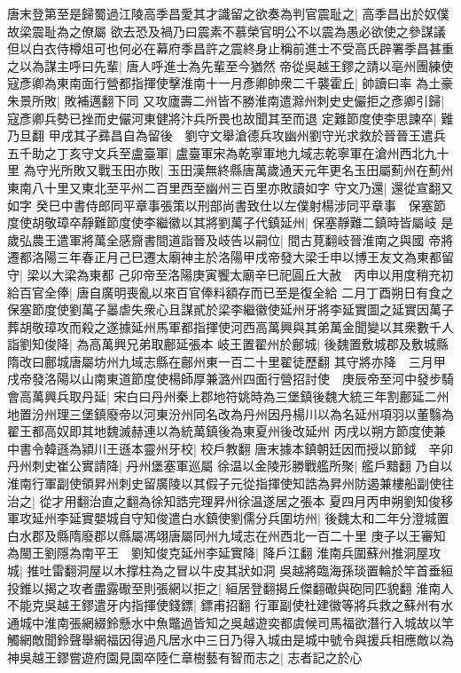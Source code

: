 唐末登第至是歸蜀過江陵高季昌愛其才識留之欲奏為判官震耻之|{
	高季昌出於奴僕故梁震耻為之僚屬}
欲去恐及禍乃曰震素不慕榮官明公不以震為愚必欲使之參謀議但以白衣侍樽俎可也何必在幕府季昌許之震終身止稱前進士不受高氏辟署季昌甚重之以為謀主呼曰先輩|{
	唐人呼進士為先輩至今猶然}
帝從吳越王鏐之請以亳州團練使寇彥卿為東南面行營都指揮使擊淮南十一月彥卿帥衆二千襲霍丘|{
	帥讀曰率}
為土豪朱景所敗|{
	敗補邁翻下同}
又攻廬壽二州皆不勝淮南遣滁州刺史史儼拒之彥卿引歸|{
	寇彥卿兵勢已挫而史儼河東健將汴兵所畏也故聞其至而退}
定難節度使李思諫卒|{
	難乃旦翻}
甲戌其子彞昌自為留後　劉守文舉滄德兵攻幽州劉守光求救於晉晉王遣兵五千助之丁亥守文兵至盧臺軍|{
	盧臺軍宋為乾寧軍地九域志乾寧軍在滄州西北九十里}
為守光所敗又戰玉田亦敗|{
	玉田漢無終縣唐萬歲通天元年更名玉田屬薊州在薊州東南八十里又東北至平州二百里西至幽州三百里亦敗讀如字}
守文乃還|{
	還從宣翻又如字}
癸巳中書侍郎同平章事張策以刑部尚書致仕以左僕射楊涉同平章事　保塞節度使胡敬璋卒靜難節度使李繼徽以其將劉萬子代鎮延州|{
	保塞靜難二鎮時皆屬岐}
是歲弘農王遣軍將萬全感齎書間道詣晉及岐告以嗣位|{
	間古莧翻岐晉淮南之與國}
帝將遷都洛陽三年春正月己巳遷太廟神主於洛陽甲戌帝發大梁壬申以博王友文為東都留守|{
	梁以大梁為東都}
己卯帝至洛陽庚寅饗太廟辛巳祀圓丘大赦　丙申以用度稍充初給百官全俸|{
	唐自廣明喪亂以來百官俸料額存而已至是復全給}
二月丁酉朔日有食之　保塞節度使劉萬子㬥虐失衆心且謀貳於梁李繼徽使延州牙將李延實圖之延實因萬子葬胡敬璋攻而殺之遂據延州馬軍都指揮使河西高萬興與其弟萬金聞變以其衆數千人詣劉知俊降|{
	為高萬興兄弟取鄜延張本}
岐王置翟州於鄜城|{
	後魏置敷城郡及敷城縣隋改曰鄜城唐屬坊州九域志縣在鄜州東一百二十里翟徒歷翻}
其守將亦降　三月甲戌帝發洛陽以山南東道節度使楊師厚兼潞州四面行營招討使　庚辰帝至河中發步騎會高萬興兵取丹延|{
	宋白曰丹州秦上郡地符姚時為三堡鎮後魏大統三年割鄜延二州地置汾州理三堡鎮廢帝以河東汾州同名改為丹州因丹楊川以為名延州項羽以董翳為翟王都高奴即其地魏滅赫連以為統萬鎮後為東夏州後改延州}
丙戌以朔方節度使兼中書令韓遜為潁川王遜本靈州牙校|{
	校戶教翻}
唐末據本鎮朝廷因而授以節鉞　辛卯丹州刺史崔公實請降|{
	丹州堡塞軍巡屬}
徐温以金陵形勝戰艦所聚|{
	艦戶黯翻}
乃自以淮南行軍副使領昇州刺史留廣陵以其假子元從指揮使知誥為昇州防遏兼樓船副使往治之|{
	從才用翻治直之翻為徐知誥完理昇州徐温遂居之張本}
夏四月丙申朔劉知俊移軍攻延州李延實嬰城自守知俊遣白水鎮使劉儒分兵圍坊州|{
	後魏太和二年分澄城置白水郡及縣隋廢郡以縣屬馮翊唐屬同州九域志在州西北一百二十里}
庚子以王審知為閩王劉隱為南平王　劉知俊克延州李延實降|{
	降戶江翻}
淮南兵圍蘇州推洞屋攻城|{
	推吐雷翻洞屋以木撑柱為之冒以牛皮其狀如洞}
吳越將臨海孫琰置輪於竿首垂絙投錐以揭之攻者盡露礮至則張網以拒之|{
	絙居登翻揭丘傑翻礮與砲同匹貌翻}
淮南人不能克吳越王鏐遣牙内指揮使錢鏢|{
	鏢甫招翻}
行軍副使杜建徽等將兵救之蘇州有水通城中淮南張網綴鈴懸水中魚鼈過皆知之吳越遊奕都虞候司馬福欲潛行入城故以竿觸網敵聞鈴聲舉網福因得過凡居水中三日乃得入城由是城中號令與援兵相應敵以為神吳越王鏐嘗遊府園見園卒陸仁章樹藝有智而志之|{
	志者記之於心}
